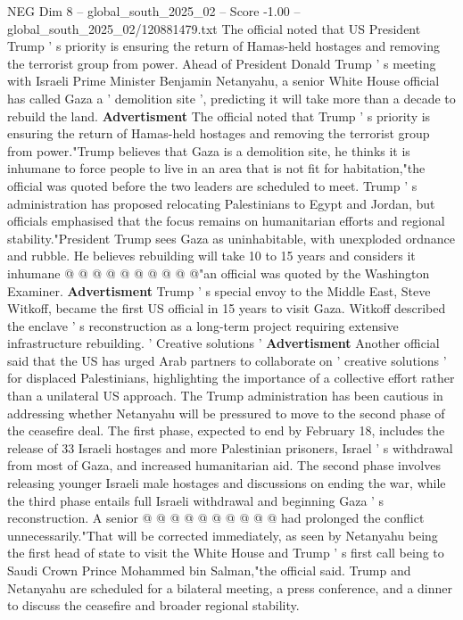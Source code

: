 \begin{textsample}{NEG Dim 8 – global\_south\_2025\_02 – Score -1.00 – global\_south\_2025\_02/120881479.txt}  \label{ex:f8_neg_066}
The official noted that US President Trump ' s priority is ensuring the return of Hamas-held hostages and removing the terrorist group from power.
Ahead of President Donald Trump ' s meeting with Israeli Prime Minister Benjamin Netanyahu, a senior White House official has called Gaza a ' demolition site ', predicting it will take more than a decade to rebuild the land. \textbf{Advertisment} The official noted that Trump ' s priority is ensuring the return of Hamas-held hostages and removing the terrorist group from power."Trump believes that Gaza is a demolition site, he thinks it is inhumane to force people to live in an area that is not fit for habitation,"the official was quoted before the two leaders are scheduled to meet.
Trump ' s administration has proposed relocating Palestinians to Egypt and Jordan, but officials emphasised that the focus remains on humanitarian efforts and regional stability."President Trump sees Gaza as uninhabitable, with unexploded ordnance and rubble.
He believes rebuilding will take 10 to 15 years and considers it inhumane @ @ @ @ @ @ @ @ @ @"an official was quoted by the Washington Examiner. \textbf{Advertisment} Trump ' s special envoy to the Middle East, Steve Witkoff, became the first US official in 15 years to visit Gaza.
Witkoff described the enclave ' s reconstruction as a long-term project requiring extensive infrastructure rebuilding. ' Creative solutions ' \textbf{Advertisment} Another official said that the US has urged Arab partners to collaborate on ' creative solutions ' for displaced Palestinians, highlighting the importance of a collective effort rather than a unilateral US approach.
The Trump administration has been cautious in addressing whether Netanyahu will be pressured to move to the second phase of the ceasefire deal.
The first phase, expected to end by February 18, includes the release of 33 Israeli hostages and more Palestinian prisoners, Israel ' s withdrawal from most of Gaza, and increased humanitarian aid.
The second phase involves releasing younger Israeli male hostages and discussions on ending the war, while the third phase entails full Israeli withdrawal and beginning Gaza ' s reconstruction.
A senior @ @ @ @ @ @ @ @ @ @ had prolonged the conflict unnecessarily."That will be corrected immediately, as seen by Netanyahu being the first head of state to visit the White House and Trump ' s first call being to Saudi Crown Prince Mohammed bin Salman,"the official said.
Trump and Netanyahu are scheduled for a bilateral meeting, a press conference, and a dinner to discuss the ceasefire and broader regional stability.

\end{textsample}

